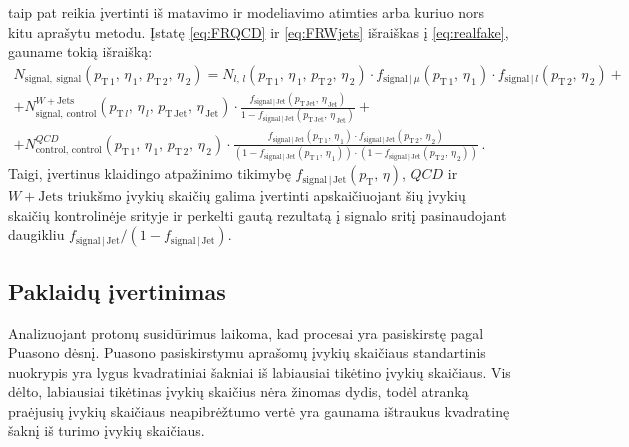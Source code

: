 \documentclass[a4paper, 12pt, oneside]{article}
\newcommand{\WJets}{W\! +\!\mathrm{Jets}}
\newcommand{\QCD}{QC\! D}
\newlength\q
\begin{document}
taip pat reikia įvertinti iš matavimo ir modeliavimo atimties arba kuriuo nors kitu aprašytu metodu.
Įstatę \eqref{eq:FRQCD} ir \eqref{eq:FRWjets} išraiškas į \eqref{eq:realfake}, gauname tokią išraišką:
\begin{multline}
	\label{eq:FRapply}
	N_{\mathrm{signal, \; signal}}(p_{\mathrm{T}\, 1}, \, \eta_{\, 1}, \, p_{\mathrm{T}\, 2}, \, \eta_{\, 2}) =
	N_{l, \, l}(p_{\mathrm{T}\, 1}, \, \eta_{\, 1}, \, p_{\mathrm{T}\, 2}, \, \eta_{\, 2}) \cdot 
	f_{\mathrm{signal} \,| \,\mu}(p_{\mathrm{T}\, 1}, \, \eta_{\, 1}) \cdot f_{\mathrm{signal} \,| \, l}(p_{\mathrm{T}\, 2}, \, \eta_{\, 2}) + \\[5pt] +
	N^{\WJets}_{\mathrm{signal, \, control}}(p_{\mathrm{T}\, l}, \, \eta_{\, l}, \, p_{\mathrm{T\, Jet}}, \, \eta_{\,\mathrm{Jet}}) \cdot
	\frac{f_{\mathrm{signal} \,| \, \mathrm{Jet}}(p_{\mathrm{T\, Jet}}, \, \eta_{\,\mathrm{Jet}})}
	{1 - f_{\mathrm{signal} \,| \, \mathrm{Jet}}(p_{\mathrm{T\, Jet}}, \, \eta_{\,\mathrm{Jet}})} + \\[5pt] +
	N^{\QCD}_{\mathrm{control, \, control}}(p_{\mathrm{T}\, 1}, \, \eta_{\, 1}, \, p_{\mathrm{T}\, 2}, \, \eta_{\, 2}) \cdot
	\frac{f_{\mathrm{signal} \,| \,\mathrm{Jet}}(p_{\mathrm{T}\, 1}, \, \eta_{\, 1})\cdot
	f_{\mathrm{signal} \,| \,\mathrm{Jet}}(p_{\mathrm{T}\, 2}, \, \eta_{\, 2})}
	{\left(1-f_{\mathrm{signal} \,| \,\mathrm{Jet}}(p_{\mathrm{T}\, 1}, \, \eta_{\, 1})\right) \cdot
	\left(1-f_{\mathrm{signal} \,| \,\mathrm{Jet}}(p_{\mathrm{T}\, 2}, \, \eta_{\, 2})\right)}\, .
\end{multline}
Taigi, įvertinus klaidingo atpažinimo tikimybę $f_{\mathrm{signal} \,| \,\mathrm{Jet}}(p_{\mathrm{T}}, \, \eta)$, $QCD$ ir
$\WJets$ triukšmo įvykių skaičių galima įvertinti apskaičiuojant šių įvykių skaičių kontrolinėje srityje ir perkelti gautą rezultatą į
signalo sritį pasinaudojant daugikliu $f_{\mathrm{signal} \,| \,\mathrm{Jet}}/(1-f_{\mathrm{signal} \,| \,\mathrm{Jet}})$.


\subsection{Paklaidų įvertinimas}\label{sec:uncertainties}

Analizuojant protonų susidūrimus laikoma, kad procesai yra pasiskirstę pagal Puasono dėsnį.
Puasono pasiskirstymu aprašomų įvykių skaičiaus standartinis nuokrypis yra lygus kvadratiniai šakniai iš labiausiai
tikėtino įvykių skaičiaus.
Vis dėlto, labiausiai tikėtinas įvykių skaičius nėra žinomas dydis, todėl atranką praėjusių įvykių skaičiaus neapibrėžtumo
vertė yra gaunama ištraukus kvadratinę šaknį iš turimo įvykių skaičiaus.
\end{document}
